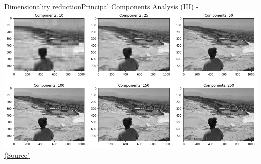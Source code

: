 \documentclass[10pt,compress]{beamer} %
\begin{document}
\begin{frame}[plain]{Dimensionality reduction}{Principal Components Analysis (III)}
-	\includegraphics[width=\linewidth]{figs/pcaexample.png}\\
   	\centering \tiny{\href{https://github.com/amueller/introduction_to_ml_with_python/blob/master/03-unsupervised-learning.ipynb}{(Source)}}
\end{frame}
\end{document}
